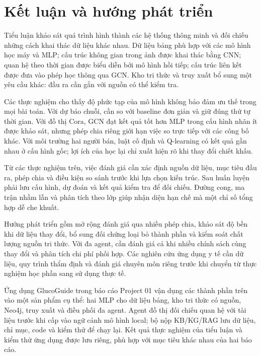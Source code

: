 \chapter*{Kết luận và hướng phát triển}
Tiểu luận khảo sát quá trình hình thành các hệ thống thông minh và đối chiếu những cách khai thác dữ liệu khác nhau. Dữ liệu bảng phù hợp với các mô hình học máy và MLP; cấu trúc không gian trong ảnh được khai thác bằng CNN; quan hệ theo thời gian được biểu diễn bởi mô hình hồi tiếp; cấu trúc liên kết được đưa vào phép học thông qua GCN. Kho tri thức và truy xuất bổ sung một yêu cầu khác: đầu ra cần gắn với nguồn có thể kiểm tra.

Các thực nghiệm cho thấy độ phức tạp của mô hình không bảo đảm ưu thế trong mọi bài toán. Với dự báo chuỗi, cần so với baseline đơn giản và giữ đúng thứ tự thời gian. Với đồ thị Cora, GCN đạt kết quả tốt hơn MLP trong cấu hình nhãn ít được khảo sát, nhưng phép chia riêng giới hạn việc so trực tiếp với các công bố khác. Với môi trường hai người bán, luật cố định và Q-learning có kết quả gần nhau ở cấu hình gốc; lợi ích của học lại chỉ xuất hiện rõ khi thay đổi chiết khấu.

Từ các thực nghiệm trên, việc đánh giá cần xác định nguồn dữ liệu, mục tiêu đầu ra, phép chia và điều kiện so sánh trước khi lựa chọn kiến trúc. Sau huấn luyện phải lưu cấu hình, dự đoán và kết quả kiểm tra để đối chiếu. Đường cong, ma trận nhầm lẫn và phân tích theo lớp giúp nhận diện hạn chế mà một chỉ số tổng hợp dễ che khuất.

Hướng phát triển gồm mở rộng đánh giá qua nhiều phép chia, khảo sát độ bền khi dữ liệu thay đổi, bổ sung đối chứng loại bỏ thành phần và kiểm soát chất lượng nguồn tri thức. Với đa agent, cần đánh giá cả khi nhiều chính sách cùng thay đổi và phân tích chi phí phối hợp. Các nghiên cứu ứng dụng y tế cần dữ liệu, quy trình thẩm định và đánh giá chuyên môn riêng trước khi chuyển từ thực nghiệm học phần sang sử dụng thực tế.

Ứng dụng GlucoGuide trong báo cáo Project 01 vận dụng các thành phần trên vào một sản phẩm cụ thể: hai MLP cho dữ liệu bảng, kho tri thức có nguồn, Neo4j, truy xuất và điều phối đa agent. Agent đồ thị đối chiếu quan hệ với tài liệu trước khi cấp vào ngữ cảnh mô hình local; bộ nộp KB/KG/RAG lưu dữ liệu, chỉ mục, code và kiểm thử để chạy lại. Kết quả thực nghiệm của tiểu luận và kiểm thử ứng dụng được lưu riêng, phù hợp với mục tiêu khác nhau của hai báo cáo.

